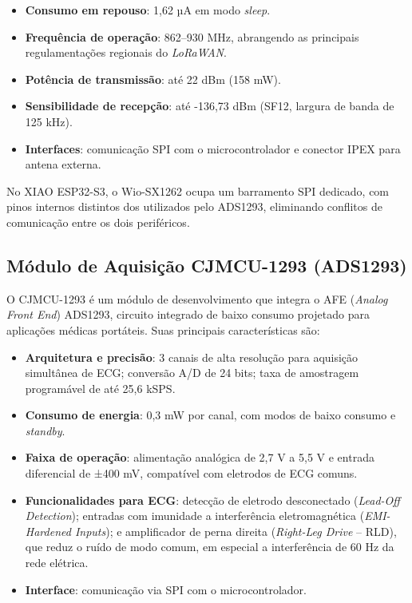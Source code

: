 \begin{itemize}
    \item \textbf{Consumo em repouso}: 1,62 µA em modo \textit{sleep}.
    \item \textbf{Frequência de operação}: 862--930 MHz, abrangendo as principais regulamentações regionais do \textit{LoRaWAN}.
    \item \textbf{Potência de transmissão}: até 22 dBm (158 mW).
    \item \textbf{Sensibilidade de recepção}: até -136,73 dBm (SF12, largura de banda de 125 kHz).
    \item \textbf{Interfaces}: comunicação \acs{SPI} com o microcontrolador e conector \acs{IPEX} para antena externa.
\end{itemize}

No XIAO ESP32-S3, o Wio-SX1262 ocupa um barramento \acs{SPI} dedicado, com pinos internos distintos dos utilizados pelo ADS1293, eliminando conflitos de comunicação entre os dois periféricos.

\subsection{Módulo de Aquisição CJMCU-1293 (ADS1293)}
\label{sec:cjmcu}

O CJMCU-1293 é um módulo de desenvolvimento que integra o \acs{AFE} (\textit{Analog Front End}) ADS1293, circuito integrado de baixo consumo projetado para aplicações médicas portáteis. Suas principais características são:

\begin{itemize}
    \item \textbf{Arquitetura e precisão}: 3 canais de alta resolução para aquisição simultânea de \acs{ECG}; conversão A/D de 24 bits; taxa de amostragem programável de até 25,6 kSPS.
    \item \textbf{Consumo de energia}: 0,3 mW por canal, com modos de baixo consumo e \textit{standby}.
    \item \textbf{Faixa de operação}: alimentação analógica de 2,7 V a 5,5 V e entrada diferencial de ±400 mV, compatível com eletrodos de \acs{ECG} comuns.
    \item \textbf{Funcionalidades para ECG}: detecção de eletrodo desconectado (\textit{Lead-Off Detection}); entradas com imunidade a interferência eletromagnética (\textit{EMI-Hardened Inputs}); e amplificador de perna direita (\textit{Right-Leg Drive} -- RLD), que reduz o ruído de modo comum, em especial a interferência de 60 Hz da rede elétrica.
    \item \textbf{Interface}: comunicação via \acs{SPI} com o microcontrolador.
\end{itemize}

